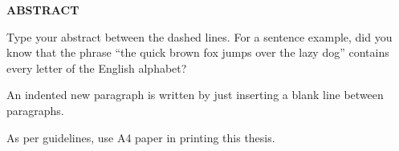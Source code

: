 \cleardoublepage{}
\begin{center}
{\bf ABSTRACT}\\[36pt]
\end{center}

{\baselineskip
Type your abstract between the dashed lines. For a sentence example, did you know that the phrase ``the quick brown fox jumps over the lazy dog'' contains every letter of the English alphabet?

An indented new paragraph is written by just inserting a blank line between paragraphs.

As per guidelines, use A4 paper in printing this thesis. 

}%